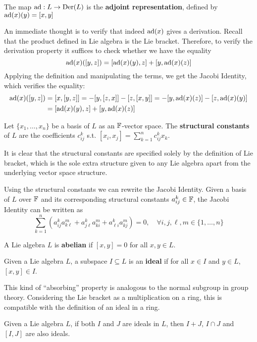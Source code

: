 \documentclass{article}
\begin{document}
\begin{definition}
    The map $\operatorname{ad}: L \to \operatorname{Der}(L)$ is the \textbf{adjoint representation}, defined by $\operatorname{ad}(x)(y) = [x, y]$
\end{definition}

\textstart
An immediate thought is to verify that indeed $\operatorname{ad}(x)$ gives a derivation. Recall that the product defined in Lie algebra is the Lie bracket. Therefore, to verify the derivation property it suffices to check whether we have the equality
\[
    \operatorname{ad}(x)([y, z]) = [\operatorname{ad}(x)(y), z] + [y, \operatorname{ad}(x)(z)]
\]
Applying the definition and manipulating the terms, we get the Jacobi Identity, which verifies the equality:
\begin{align*}
    \operatorname{ad}(x)([y, z])
    & = [x, [y, z]] = -[y, [z, x]] - [z, [x, y]] = -[y, \operatorname{ad}(x)(z)] - [z, \operatorname{ad}(x)(y)] \\
    & = [\operatorname{ad}(x)(y), z] + [y, \operatorname{ad}(x)(z)]
\end{align*}

\begin{definition}
    Let $\{x_1, \dots, x_n\}$ be a basis of $L$ as an $\mathbb{F}$-vector space. The \textbf{structural constants} of $L$ are the coefficients $c_{ij}^k$ s.t. $[x_i, x_j] = \sum_{k = 1}^n c_{ij}^k x_k$.
\end{definition}

\textstart
It is clear that the structural constants are specified solely by the definition of Lie bracket, which is the sole extra structure given to any Lie algebra apart from the underlying vector space structure.

\begin{remark}
    Using the structural constants we can rewrite the Jacobi Identity. Given a basis of $L$ over $\mathbb{F}$ and its corresponding structural constants $a_{ij}^k \in \mathbb{F}$, the Jacobi Identity can be written as
    \[
        \sum_{k = 1}^n \left( a_{ij}^k a_{k \ell}^m + a_{j\ell}^k a_{ki}^m + a_{\ell i}^k a_{kj}^m \right) = 0, \quad \forall i, j, \ell, m \in \{1, \dots, n\}
    \]
\end{remark}

\begin{definition}[Abelian]
    A Lie algebra $L$ is \textbf{abelian} if $[x, y] = 0$ for all $x, y \in L$.
\end{definition}

\begin{definition}[Ideal]
    Given a Lie algebra $L$, a subspace $I \subseteq L$ is an \textbf{ideal} if for all $x \in I$ and $y \in L$, $[x, y] \in I$.
\end{definition}
\nogap
\begin{remark}
    This kind of ``absorbing'' property is analogous to the normal subgroup in group theory. Considering the Lie bracket as a multiplication on a ring, this is compatible with the definition of an ideal in a ring.
\end{remark}
\nogap
\begin{remark}\label{rmk: extending ideals}
    Given a Lie algebra $L$, if both $I$ and $J$ are ideals in $L$, then $I + J$, $I \cap J$ and $[I, J]$ are also ideals.
\end{remark}
\end{document}
